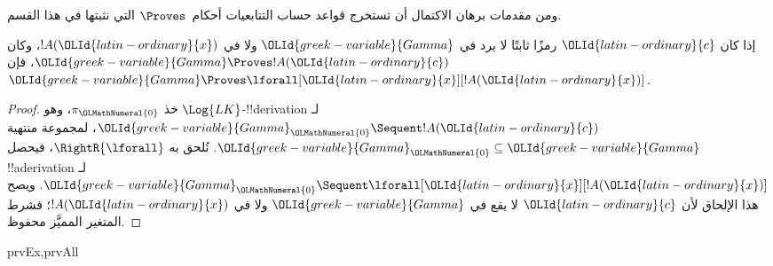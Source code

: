 \documentclass[../../../include/open-logic-section]{subfiles}
\begin{document}

\begin{explain}
  ومن مقدمات برهان الاكتمال أن تستخرج قواعد حساب التتابعيات أحكام~$\Proves$ التي نثبتها في هذا القسم.
\end{explain}

\begin{thm}
 إذا كان ${\OLId{latin-ordinary}{c}}$ رمزًا ثابتًا لا يرد
في ${\OLId{greek-variable}{Gamma}}$ ولا في $!A({\OLId{latin-ordinary}{x}})$، وكان ${\OLId{greek-variable}{Gamma}} \Proves !A({\OLId{latin-ordinary}{c}})$، فإن
${\OLId{greek-variable}{Gamma}} \Proves \lforall[{\OLId{latin-ordinary}{x}}][!A({\OLId{latin-ordinary}{x}})]$.
\end{thm}

\begin{proof}
خذ $\pi_{\OLMathNumeral{0}}$، وهو $\Log{LK}$-!!{derivation} لـ
${\OLId{greek-variable}{Gamma}}_{\OLMathNumeral{0}} \Sequent !A({\OLId{latin-ordinary}{c}})$، لمجموعة منتهية ${\OLId{greek-variable}{Gamma}}_{\OLMathNumeral{0}} \subseteq {\OLId{greek-variable}{Gamma}}$.
نُلحق به $\RightR{\lforall}$، فيحصل !!a{derivation} لـ
${\OLId{greek-variable}{Gamma}}_{\OLMathNumeral{0}} \Sequent \lforall[{\OLId{latin-ordinary}{x}}][!A({\OLId{latin-ordinary}{x}})]$.
ويصح هذا الإلحاق لأن ${\OLId{latin-ordinary}{c}}$ لا يقع في
${\OLId{greek-variable}{Gamma}}$ ولا في $!A({\OLId{latin-ordinary}{x}})$؛ فشرط المتغير المميَّز محفوظ.
\end{proof}

\begin{prop}
\begin{tagenumerate}{prvEx,prvAll}
\end{tagenumerate}
\end{prop}
\end{document}
